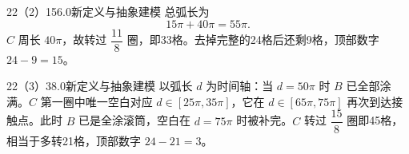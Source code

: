 \begin{solution}{22（2）}{15}{6.0}{新定义与抽象建模}
总弧长为
\[
  15\pi+40\pi=55\pi.
\]
\(C\) 周长 \(40\pi\)，故转过 \(\dfrac{11}{8}\) 圈，即33格。去掉完整的24格后还剩9格，顶部数字 \(24-9=15\)。
\end{solution}

\begin{solution}{22（3）}{3}{8.0}{新定义与抽象建模}
以弧长 \(d\) 为时间轴：当 \(d=50\pi\) 时 \(B\) 已全部涂满。\(C\) 第一圈中唯一空白对应 \(d\in[25\pi,35\pi]\)，它在 \(d\in[65\pi,75\pi]\) 再次到达接触点。此时 \(B\) 已是全涂滚筒，空白在 \(d=75\pi\) 时被补完。\(C\) 转过 \(\dfrac{15}{8}\) 圈即45格，相当于多转21格，顶部数字 \(24-21=3\)。
\end{solution}
